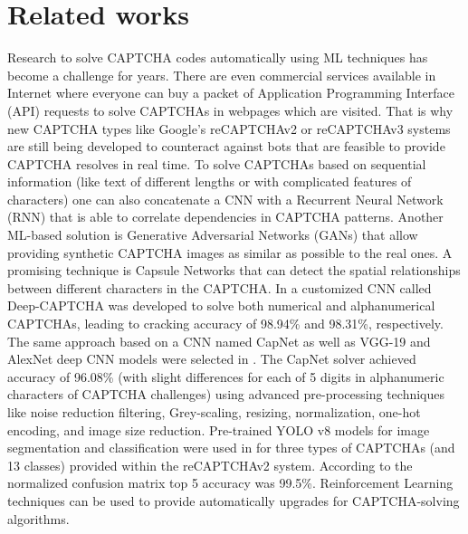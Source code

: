 \section{Related works}
Research to solve CAPTCHA codes automatically using ML techniques has become a challenge for years. There are even commercial services available in Internet where everyone can buy a packet of Application Programming Interface (API) requests to solve CAPTCHAs in webpages which are visited. That is why new CAPTCHA types like Google’s reCAPTCHAv2 or reCAPTCHAv3 systems are still being developed to counteract against bots that are feasible to provide CAPTCHA resolves in real time. To solve CAPTCHAs based on sequential information (like text of different lengths or with complicated features of characters) one can also concatenate a CNN with a Recurrent Neural Network (RNN) \cite{Shu_Xu} that is able to correlate dependencies in CAPTCHA patterns. Another ML-based solution is Generative Adversarial Networks (GANs) \cite{Zhang2020} that allow providing synthetic CAPTCHA images as similar as possible to the real ones. A promising technique is Capsule Networks \cite{Mocanu2022} that can detect the spatial relationships between different characters in the CAPTCHA. In \cite{Zahra2020} a customized CNN called Deep-CAPTCHA was developed to solve both numerical and alphanumerical CAPTCHAs, leading to cracking accuracy of 98.94\% and 98.31\%, respectively. The same approach based on a CNN named CapNet as well as VGG-19 and AlexNet deep CNN models were selected in \cite{Walia2023}. The CapNet solver achieved accuracy of 96.08\% (with slight differences for each of 5 digits in alphanumeric characters of CAPTCHA challenges) using advanced pre-processing techniques like noise reduction filtering, Grey-scaling, resizing, normalization, one-hot encoding, and image size reduction. Pre-trained YOLO v8 models for image segmentation and classification were used in \cite{Plesner2024} for three types of CAPTCHAs (and 13 classes) provided within the reCAPTCHAv2 system. According to the normalized confusion matrix top 5 accuracy was 99.5\%. Reinforcement Learning techniques can be used to provide automatically upgrades for CAPTCHA-solving algorithms.